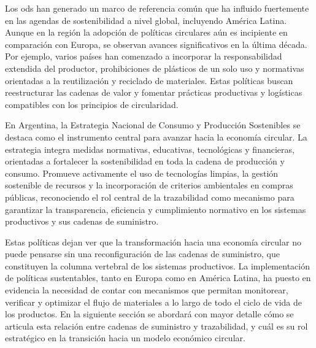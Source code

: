 Los \acrshort{ods} han generado un marco de referencia común que ha influido fuertemente en las agendas de sostenibilidad a nivel global, incluyendo América Latina. Aunque en la región la adopción de políticas circulares aún es incipiente en comparación con Europa, se observan avances significativos en la última década. Por ejemplo, varios países han comenzado a incorporar la responsabilidad extendida del productor, prohibiciones de plásticos de un solo uso y normativas orientadas a la reutilización y reciclado de materiales. Estas políticas buscan reestructurar las cadenas de valor y fomentar prácticas productivas y logísticas compatibles con los principios de circularidad.

En Argentina, la Estrategia Nacional de Consumo y Producción Sostenibles se destaca como el instrumento central para avanzar hacia la economía circular. La estrategia integra medidas normativas, educativas, tecnológicas y financieras, orientadas a fortalecer la sostenibilidad en toda la cadena de producción y consumo. Promueve activamente el uso de tecnologías limpias, la gestión sostenible de recursos y la incorporación de criterios ambientales en compras públicas, reconociendo el rol central de la trazabilidad como mecanismo para garantizar la transparencia, eficiencia y cumplimiento normativo en los sistemas productivos y sus cadenas de suministro.


Estas políticas dejan ver que la transformación hacia una economía circular no puede pensarse sin una reconfiguración de las cadenas de suministro, que constituyen la columna vertebral de los sistemas productivos. La implementación de políticas sustentables, tanto en Europa como en América Latina, ha puesto en evidencia la necesidad de contar con mecanismos que permitan monitorear, verificar y optimizar el flujo de materiales a lo largo de todo el ciclo de vida de los productos. En la siguiente sección se abordará con mayor detalle cómo se articula esta relación entre cadenas de suministro y trazabilidad, y cuál es su rol estratégico en la transición hacia un modelo económico circular.

